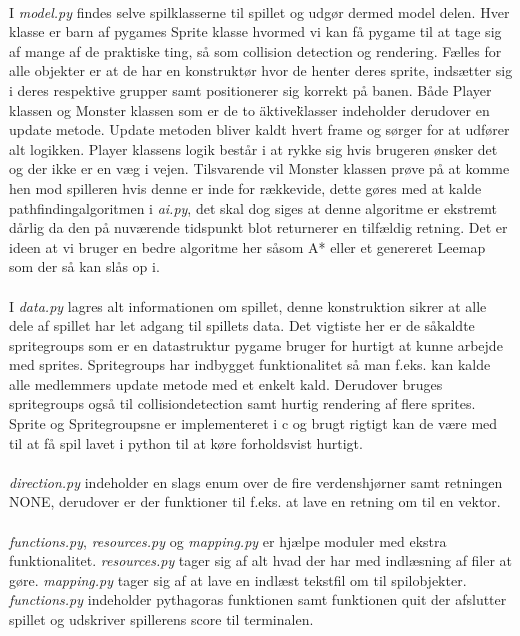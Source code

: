 \documentclass[10pt,a4paper,danish]{article}
\begin{document}
\paragraph{}
I \textit{model.py} findes selve spilklasserne til spillet og udgør dermed model delen. Hver klasse er barn af pygames Sprite klasse hvormed vi kan få pygame til at tage sig af mange af de praktiske ting, så som collision detection og rendering. Fælles for alle objekter er at de har en konstruktør hvor de henter deres sprite, indsætter sig i deres respektive grupper samt positionerer sig korrekt på banen. Både Player klassen og Monster klassen som er de to \"aktive\" klasser indeholder derudover en update metode. Update metoden bliver kaldt hvert frame og sørger for at udfører alt logikken. Player klassens logik består i at rykke sig hvis brugeren ønsker det og der ikke er en væg i vejen. Tilsvarende vil Monster klassen prøve på at komme hen mod spilleren hvis denne er inde for rækkevide, dette gøres med at kalde pathfindingalgoritmen i \textit{ai.py}, det skal dog siges at denne algoritme er ekstremt dårlig da den på nuværende tidspunkt blot returnerer en tilfældig retning. Det er ideen at vi bruger en bedre algoritme her såsom A* eller et genereret Leemap som der så kan slås op i.

\paragraph{}
I \textit{data.py} lagres alt informationen om spillet, denne konstruktion sikrer at alle dele af spillet har let adgang til spillets data.
Det vigtiste her er de såkaldte spritegroups som er en datastruktur pygame bruger for hurtigt at kunne arbejde med sprites. Spritegroups har indbygget funktionalitet så man f.eks. kan kalde alle medlemmers update metode med et enkelt kald. Derudover bruges spritegroups også til collisiondetection samt hurtig rendering af flere sprites. Sprite og Spritegroupsne er implementeret i c og brugt rigtigt kan de være med til at få spil lavet i python til at køre forholdsvist hurtigt.

\paragraph{}
\textit{direction.py} indeholder en slags enum over de fire verdenshjørner samt retningen NONE, derudover er der funktioner til f.eks. at lave en retning om til en vektor.

\paragraph{}
\textit{functions.py}, \textit{resources.py} og \textit{mapping.py} er hjælpe moduler med ekstra funktionalitet. \textit{resources.py} tager sig af alt hvad der har med indlæsning af filer at gøre. \textit{mapping.py} tager sig af at lave en indlæst tekstfil om til spilobjekter. \textit{functions.py} indeholder pythagoras funktionen samt funktionen quit der afslutter spillet og udskriver spillerens score til terminalen.
\end{document}
